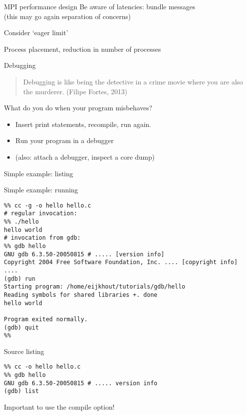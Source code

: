 \begin{numberedframe}{MPI performance design}
  Be aware of latencies: bundle messages\\
  (this may go again separation of concerns)

  Consider `eager limit'

  Process placement, reduction in number of processes
\end{numberedframe}

 {Debugging}

\begin{numberedframe}{}
\begin{quotation}
  Debugging is like being the detective in a crime movie where you are
  also the murderer. (Filipe Fortes, 2013)
\end{quotation}
What do you do when your program misbehaves?
\begin{itemize}
\item Insert print statements, recompile, run again.
\item Run your program in a debugger
\item (also: attach a debugger, inspect a core dump)
\end{itemize}
\end{numberedframe}

\begin{numberedframe}{Simple example: listing}
\end{numberedframe}

\begin{numberedframe}{Simple example: running}
  \small
\begin{verbatim}
%% cc -g -o hello hello.c
# regular invocation:
%% ./hello
hello world
# invocation from gdb:
%% gdb hello
GNU gdb 6.3.50-20050815 # ..... [version info]
Copyright 2004 Free Software Foundation, Inc. .... [copyright info] ....
(gdb) run
Starting program: /home/eijkhout/tutorials/gdb/hello 
Reading symbols for shared libraries +. done
hello world

Program exited normally.
(gdb) quit
%%
\end{verbatim}  
\end{numberedframe}

\begin{numberedframe}{Source listing}
\begin{verbatim}
%% cc -o hello hello.c
%% gdb hello
GNU gdb 6.3.50-20050815 # ..... version info
(gdb) list
\end{verbatim}
Important to use the  compile option!
\end{numberedframe}

